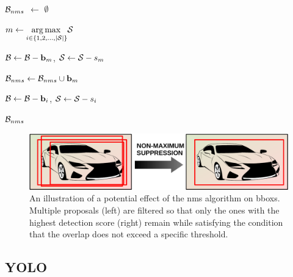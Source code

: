 \begin{algorithmic}[1]

    \State $\mathcal{B}_{nms}$ $\gets$ $\emptyset$


    \State $m \gets \underset{i \in \left\{ {1, 2, \dots, \left\vert \mathcal{S} \right\vert} \right\}}{\operatorname*{arg\,max}{}} \mathcal{S}$

    \State $\mathcal{B} \gets \mathcal{B} - \mathbf{b}_m$, $\mathcal{S} \gets \mathcal{S} - s_m$

    \State $\mathcal{B}_{nms} \gets \mathcal{B}_{nms} \cup \mathbf{b}_m$



    \State $\mathcal{B} \gets \mathcal{B} - \mathbf{b}_i$, $\mathcal{S} \gets \mathcal{S} - s_i$
    \EndIf
    \EndFor
    \EndWhile

    \State \Return $\mathcal{B}_{nms}$
    \EndFunction
\end{algorithmic}

\begin{figure}[t]
    \centerline{\includegraphics[width=0.6\linewidth]{figures/theoretical_foundations/non_maximum_suppression.pdf}}
    \caption[\Gls{nms} visualization]{An illustration of a potential effect of the \gls{nms} algorithm on \glspl{bbox}. Multiple proposals (left) are filtered so that only the ones with the highest detection score (right) remain while satisfying the condition that the overlap does not exceed a specific threshold.}
    \label{fig:NonMaximumSuppression}
\end{figure}

\subsection{YOLO}
\label{ssec:YouLookOnlyOnce}

